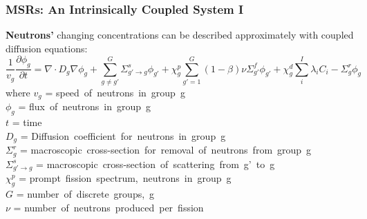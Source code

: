 \begin{frame}
  \frametitle{MSRs: An Intrinsically Coupled System I}
      \textbf{Neutrons'}
      changing concentrations can be described approximately with coupled diffusion equations:
\begin{equation}
				\frac{1}{v_g}\frac{\partial \phi_g}{\partial t}   = \nabla \cdot D_g
				\nabla \phi_g +
				\sum_{g \ne g'}^G
				\Sigma_{g'\rightarrow g}^s \phi_{g'} + \chi_g^p \sum_{g' = 1}^G (1 -
				\beta) \nu \Sigma_{g'}^f \phi_{g'} + \chi_g^d \sum_i^I \lambda_i C_i - \Sigma_g^r \phi_g
		\label{eq:neutrons}
\end{equation}
				where
				$v_g    $    = \mbox{speed of neutrons in group g} \\
				$\phi_g $    = \mbox{flux of neutrons in group g} \\
				$t      $    = \mbox{time} \\
				$D_g    $    = \mbox{Diffusion coefficient for neutrons in group g} \\
				$\Sigma_g^r$ = \mbox{macroscopic cross-section for removal of neutrons
				from group g} \\
				$\Sigma_{g'\rightarrow g}^s$ = \mbox{macroscopic cross-section of
				scattering from g' to g} \\
				$\chi_g^p$   = \mbox{prompt fission spectrum, neutrons in group g} \\
				$G$          = \mbox{number of discrete groups, g} \\
				$\nu$        = \mbox{number of neutrons produced per fission} \\

\end{frame}

